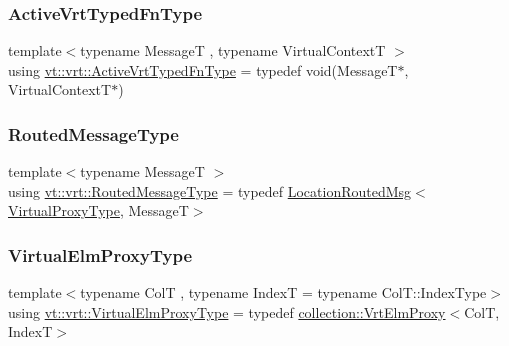 \mbox{\label{namespacevt_1_1vrt_a14077459ea3367e5834151d314ff4bc8}} 
\subsubsection{\texorpdfstring{Active\+Vrt\+Typed\+Fn\+Type}{ActiveVrtTypedFnType}}
{\footnotesize\ttfamily template$<$typename MessageT , typename Virtual\+ContextT $>$ \\
using \hyperlink{namespacevt_1_1vrt_a14077459ea3367e5834151d314ff4bc8}{vt\+::vrt\+::\+Active\+Vrt\+Typed\+Fn\+Type} = typedef void(MessageT$\ast$, Virtual\+ContextT$\ast$)}

\mbox{\label{namespacevt_1_1vrt_a00a8c6e49603fd62cd0a3fbd99277e36}} 
\subsubsection{\texorpdfstring{Routed\+Message\+Type}{RoutedMessageType}}
{\footnotesize\ttfamily template$<$typename MessageT $>$ \\
using \hyperlink{namespacevt_1_1vrt_a00a8c6e49603fd62cd0a3fbd99277e36}{vt\+::vrt\+::\+Routed\+Message\+Type} = typedef \hyperlink{namespacevt_a0cb65f2151629893480ef391def4e733}{Location\+Routed\+Msg}$<$\hyperlink{namespacevt_a1b417dd5d684f045bb58a0ede70045ac}{Virtual\+Proxy\+Type}, MessageT$>$}

\mbox{\label{namespacevt_1_1vrt_a620a5c8c59d13e513f690c74b4af516f}} 
\subsubsection{\texorpdfstring{Virtual\+Elm\+Proxy\+Type}{VirtualElmProxyType}}
{\footnotesize\ttfamily template$<$typename ColT , typename IndexT  = typename Col\+T\+::\+Index\+Type$>$ \\
using \hyperlink{namespacevt_1_1vrt_a620a5c8c59d13e513f690c74b4af516f}{vt\+::vrt\+::\+Virtual\+Elm\+Proxy\+Type} = typedef \hyperlink{structvt_1_1vrt_1_1collection_1_1_vrt_elm_proxy}{collection\+::\+Vrt\+Elm\+Proxy}$<$ColT, IndexT$>$}

